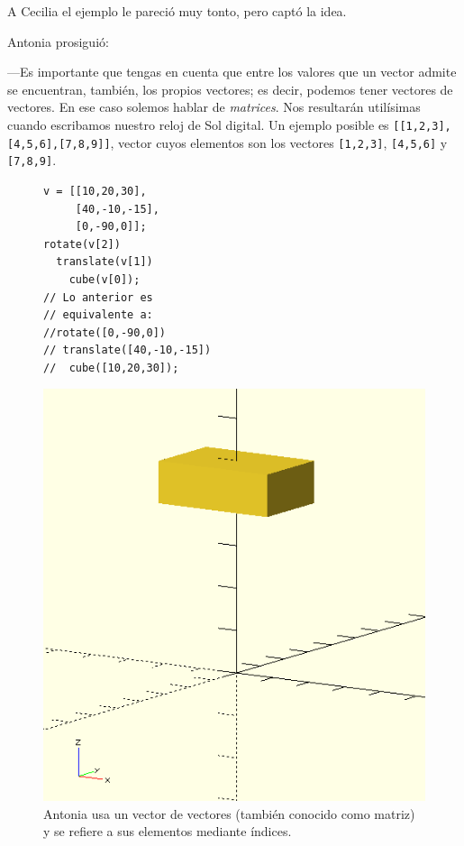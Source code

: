     A Cecilia el ejemplo le pareció muy tonto, pero captó la idea.

  Antonia prosiguió:

  ---Es importante que tengas en cuenta que entre los valores que un
  vector admite se encuentran, también, los propios vectores; es decir, podemos tener
  vectores de vectores. En ese caso solemos hablar de
  \emph{matrices}. Nos resultarán utilísimas cuando escribamos nuestro
  reloj de Sol digital. Un ejemplo posible es \lstinline![[1,2,3],[4,5,6],[7,8,9]]!, vector cuyos elementos son los vectores \lstinline![1,2,3]!, \lstinline![4,5,6]! y \lstinline![7,8,9]!.

  \begin{figure}[ht]    
  \begin{minipage}[]{.6\textwidth}
    \begin{lstlisting}
v = [[10,20,30],
     [40,-10,-15],
     [0,-90,0]];
rotate(v[2])
  translate(v[1])
    cube(v[0]);
// Lo anterior es
// equivalente a:    
//rotate([0,-90,0])
// translate([40,-10,-15])
//  cube([10,20,30]);
\end{lstlisting}
  \end{minipage}\hfill
    \begin{minipage}[]{.4\textwidth}
      \centering
      \includegraphics[width=\textwidth]{imagenes/cubo-vector}
    \end{minipage}
    \caption{Antonia usa un vector de vectores (también conocido como
      matriz) y se refiere a sus elementos mediante índices.}
      \label{fig:matrices-1}
    \end{figure}

